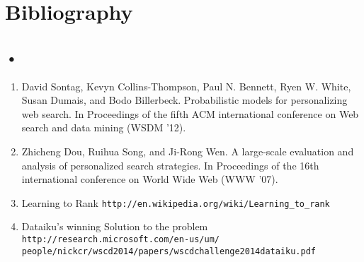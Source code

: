 \documentclass[11pt]{article}
\begin{document}
\section{Bibliography}
\subsection*{•}
\vspace{-5mm}
\begin{enumerate}\setlength{\itemsep}{-5pt}
\item David Sontag, Kevyn Collins-Thompson, Paul N. Bennett, Ryen W. White, Susan Dumais, and Bodo Billerbeck. Probabilistic models for personalizing web search. In Proceedings of the fifth ACM international conference on Web search and data mining (WSDM '12).
\item Zhicheng Dou, Ruihua Song, and Ji-Rong Wen.  A large-scale evaluation and analysis of personalized search strategies. In Proceedings of the 16th international conference on World Wide Web (WWW '07).
\item Learning to Rank \texttt{http://en.wikipedia.org/wiki/Learning\_to\_rank}
\item Dataiku's winning Solution to the problem \texttt{http://research.microsoft.com/en-us/um/ \\ people/nickcr/wscd2014/papers/wscdchallenge2014dataiku.pdf}

\end{enumerate}
\end{document}
